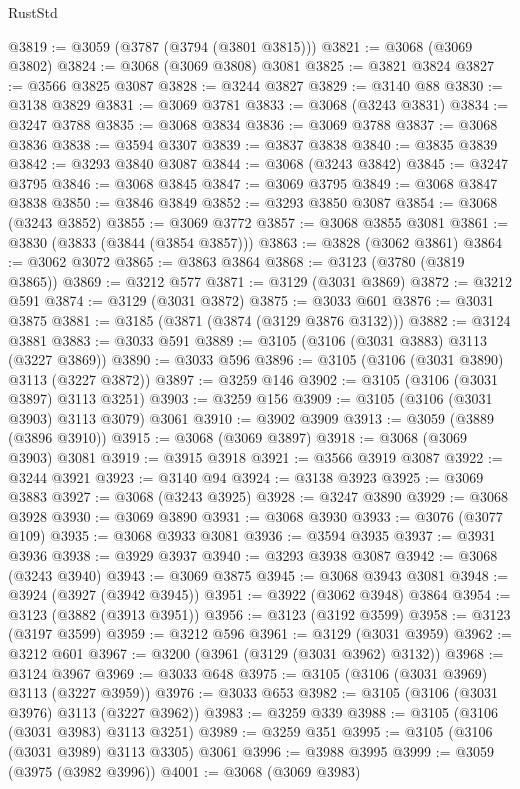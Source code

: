 \begin{lexlean}{RustStd}
\begin{coremodule}
@3819 := @3059 (@3787 (@3794 (@3801 @3815)))
@3821 := @3068 (@3069 @3802)
@3824 := @3068 (@3069 @3808) @3081
@3825 := @3821 @3824
@3827 := @3566 @3825 @3087
@3828 := @3244 @3827
@3829 := @3140 @88
@3830 := @3138 @3829
@3831 := @3069 @3781
@3833 := @3068 (@3243 @3831)
@3834 := @3247 @3788
@3835 := @3068 @3834
@3836 := @3069 @3788
@3837 := @3068 @3836
@3838 := @3594 @3307
@3839 := @3837 @3838
@3840 := @3835 @3839
@3842 := @3293 @3840 @3087
@3844 := @3068 (@3243 @3842)
@3845 := @3247 @3795
@3846 := @3068 @3845
@3847 := @3069 @3795
@3849 := @3068 @3847 @3838
@3850 := @3846 @3849
@3852 := @3293 @3850 @3087
@3854 := @3068 (@3243 @3852)
@3855 := @3069 @3772
@3857 := @3068 @3855 @3081
@3861 := @3830 (@3833 (@3844 (@3854 @3857)))
@3863 := @3828 (@3062 @3861)
@3864 := @3062 @3072
@3865 := @3863 @3864
@3868 := @3123 (@3780 (@3819 @3865))
@3869 := @3212 @577
@3871 := @3129 (@3031 @3869)
@3872 := @3212 @591
@3874 := @3129 (@3031 @3872)
@3875 := @3033 @601
@3876 := @3031 @3875
@3881 := @3185 (@3871 (@3874 (@3129 @3876 @3132)))
@3882 := @3124 @3881
@3883 := @3033 @591
@3889 := @3105 (@3106 (@3031 @3883) @3113 (@3227 @3869))
@3890 := @3033 @596
@3896 := @3105 (@3106 (@3031 @3890) @3113 (@3227 @3872))
@3897 := @3259 @146
@3902 := @3105 (@3106 (@3031 @3897) @3113 @3251)
@3903 := @3259 @156
@3909 := @3105 (@3106 (@3031 @3903) @3113 @3079) @3061
@3910 := @3902 @3909
@3913 := @3059 (@3889 (@3896 @3910))
@3915 := @3068 (@3069 @3897)
@3918 := @3068 (@3069 @3903) @3081
@3919 := @3915 @3918
@3921 := @3566 @3919 @3087
@3922 := @3244 @3921
@3923 := @3140 @94
@3924 := @3138 @3923
@3925 := @3069 @3883
@3927 := @3068 (@3243 @3925)
@3928 := @3247 @3890
@3929 := @3068 @3928
@3930 := @3069 @3890
@3931 := @3068 @3930
@3933 := @3076 (@3077 @109)
@3935 := @3068 @3933 @3081
@3936 := @3594 @3935
@3937 := @3931 @3936
@3938 := @3929 @3937
@3940 := @3293 @3938 @3087
@3942 := @3068 (@3243 @3940)
@3943 := @3069 @3875
@3945 := @3068 @3943 @3081
@3948 := @3924 (@3927 (@3942 @3945))
@3951 := @3922 (@3062 @3948) @3864
@3954 := @3123 (@3882 (@3913 @3951))
@3956 := @3123 (@3192 @3599)
@3958 := @3123 (@3197 @3599)
@3959 := @3212 @596
@3961 := @3129 (@3031 @3959)
@3962 := @3212 @601
@3967 := @3200 (@3961 (@3129 (@3031 @3962) @3132))
@3968 := @3124 @3967
@3969 := @3033 @648
@3975 := @3105 (@3106 (@3031 @3969) @3113 (@3227 @3959))
@3976 := @3033 @653
@3982 := @3105 (@3106 (@3031 @3976) @3113 (@3227 @3962))
@3983 := @3259 @339
@3988 := @3105 (@3106 (@3031 @3983) @3113 @3251)
@3989 := @3259 @351
@3995 := @3105 (@3106 (@3031 @3989) @3113 @3305) @3061
@3996 := @3988 @3995
@3999 := @3059 (@3975 (@3982 @3996))
@4001 := @3068 (@3069 @3983)

\end{coremodule}
\end{lexlean}
